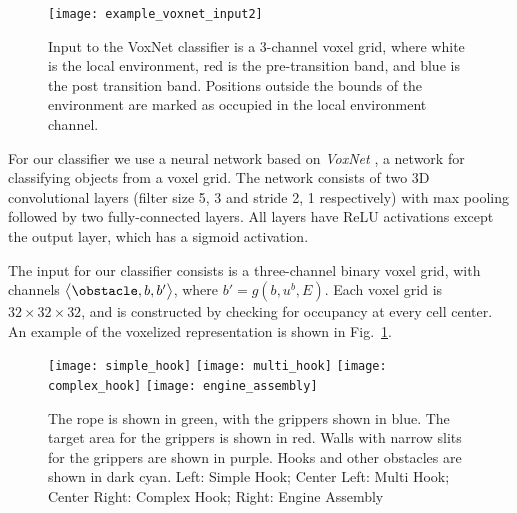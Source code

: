 \begin{figure}[t]
    \vspace{0.02in}
    \centering
    \texttt{[image: example\_voxnet\_input2]}
    \caption{Input to the VoxNet classifier is a 3-channel voxel grid, where white is the local environment, red is the pre-transition band, and blue is the post transition band. Positions outside the bounds of the environment are marked as occupied in the local environment channel.}
    \vspace{-0.1in}
    \label{fig:VoxNet_input}
\end{figure}



For our classifier we use a neural network based on \textit{VoxNet} \cite{Maturana2015VoxNet}, a network for classifying objects from a voxel grid. The network consists of two 3D convolutional layers (filter size 5, 3 and stride 2, 1 respectively) with max pooling followed by two fully-connected layers. All layers have ReLU activations except the output layer, which has a sigmoid activation.

The input for our classifier consists is a three-channel binary voxel grid, with channels  $\big<\obstacle, b, b'\big>$, where $b' = g(b, u^b, E)$. Each voxel grid is $32\times32\times32$, and is constructed by checking for occupancy at every cell center. An example of the voxelized representation is shown in Fig.~\ref{fig:VoxNet_input}.



\begin{figure*}[t]
    \vspace{0.02in}
    \centering
    \texttt{[image: simple\_hook]}\hfill
    \texttt{[image: multi\_hook]}\hfill
    \texttt{[image: complex\_hook]}\hfill
    \texttt{[image: engine\_assembly]}%
    \vspace{-0.1in}
    \caption{The rope is shown in green, with the grippers shown in blue. The target area for the grippers is shown in red. Walls with narrow slits for the grippers are shown in purple. Hooks and other obstacles are shown in dark cyan. Left: Simple Hook; Center Left: Multi Hook; Center Right: Complex Hook; Right: Engine Assembly}
    \label{fig:scenarios}
    \vspace{-0.25in}
\end{figure*}

